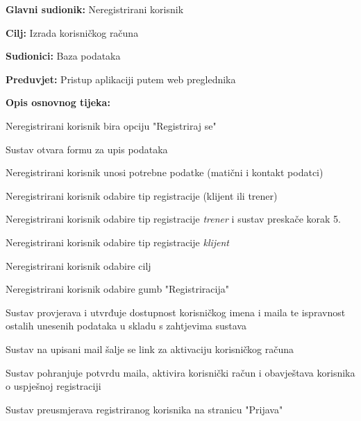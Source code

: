 					\noindent {}
					\begin{packed_item}
	
						\item \textbf{Glavni sudionik: } Neregistrirani korisnik
						\item  \textbf{Cilj:} Izrada korisničkog računa
						\item  \textbf{Sudionici:} Baza podataka
						\item  \textbf{Preduvjet:} Pristup aplikaciji putem web preglednika
						\item  \textbf{Opis osnovnog tijeka:}
						
						\item[] \begin{packed_enum}
							
							\item Neregistrirani korisnik bira opciju "Registriraj se"
       					\item Sustav otvara formu za upis podataka
							\item Neregistrirani korisnik unosi potrebne podatke (matični i kontakt podatci)
							\item Neregistrirani korisnik odabire tip registracije (klijent ili trener)
							\begin{packed_enum}
							    \item Neregistrirani korisnik odabire tip registracije \textit{trener} i sustav preskače korak 5.
							    \item Neregistrirani korisnik odabire tip registracije \textit{klijent}
							\end{packed_enum}
							
							\item Neregistrirani korisnik odabire cilj
							
                            \item Neregistrirani korisnik odabire gumb "Registriracija"
							\item Sustav provjerava i utvrđuje dostupnost korisničkog imena i maila te ispravnost ostalih unesenih podataka u skladu s zahtjevima sustava
							\item Sustav na upisani mail šalje se link za aktivaciju korisničkog računa
                            \item Sustav pohranjuje potvrdu maila, aktivira korisnički račun i obavještava korisnika o uspješnoj registraciji
                            \item Sustav preusmjerava registriranog korisnika na stranicu "Prijava"
							

\end{packed_enum}
\end{packed_item}
